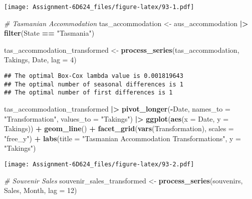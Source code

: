 \documentclass[
]{article}
\newenvironment{Shaded}{\begin{snugshade}}{\end{snugshade}}
\newcommand{\AttributeTok}[1]{\textcolor[rgb]{0.13,0.29,0.53}{#1}}
\newcommand{\CommentTok}[1]{\textcolor[rgb]{0.56,0.35,0.01}{\textit{#1}}}
\newcommand{\DecValTok}[1]{\textcolor[rgb]{0.00,0.00,0.81}{#1}}
\newcommand{\FunctionTok}[1]{\textcolor[rgb]{0.13,0.29,0.53}{\textbf{#1}}}
\newcommand{\NormalTok}[1]{#1}
\newcommand{\OtherTok}[1]{\textcolor[rgb]{0.56,0.35,0.01}{#1}}
\newcommand{\SpecialCharTok}[1]{\textcolor[rgb]{0.81,0.36,0.00}{\textbf{#1}}}
\newcommand{\StringTok}[1]{\textcolor[rgb]{0.31,0.60,0.02}{#1}}
\begin{document}
\texttt{[image: Assignment-6D624\_files/figure-latex/93-1.pdf]}

\begin{Shaded}
\begin{Highlighting}[]
\CommentTok{\# Tasmanian Accommodation}
\NormalTok{tas\_accommodation }\OtherTok{\textless{}{-}}\NormalTok{ aus\_accommodation }\SpecialCharTok{|\textgreater{}} 
  \FunctionTok{filter}\NormalTok{(State }\SpecialCharTok{==} \StringTok{"Tasmania"}\NormalTok{)}

\NormalTok{tas\_accommodation\_transformed }\OtherTok{\textless{}{-}} \FunctionTok{process\_series}\NormalTok{(tas\_accommodation, Takings, Date, }\AttributeTok{lag =} \DecValTok{4}\NormalTok{)}
\end{Highlighting}
\end{Shaded}

\begin{verbatim}
## The optimal Box-Cox lambda value is 0.001819643 
## The optimal number of seasonal differences is 1 
## The optimal number of first differences is 1
\end{verbatim}

\begin{Shaded}
\begin{Highlighting}[]
\NormalTok{tas\_accommodation\_transformed }\SpecialCharTok{|\textgreater{}} 
  \FunctionTok{pivot\_longer}\NormalTok{(}\SpecialCharTok{{-}}\NormalTok{Date, }\AttributeTok{names\_to =} \StringTok{"Transformation"}\NormalTok{, }\AttributeTok{values\_to =} \StringTok{"Takings"}\NormalTok{) }\SpecialCharTok{|\textgreater{}} 
  \FunctionTok{ggplot}\NormalTok{(}\FunctionTok{aes}\NormalTok{(}\AttributeTok{x =}\NormalTok{ Date, }\AttributeTok{y =}\NormalTok{ Takings)) }\SpecialCharTok{+}
  \FunctionTok{geom\_line}\NormalTok{() }\SpecialCharTok{+}
  \FunctionTok{facet\_grid}\NormalTok{(}\FunctionTok{vars}\NormalTok{(Transformation), }\AttributeTok{scales =} \StringTok{"free\_y"}\NormalTok{) }\SpecialCharTok{+}
  \FunctionTok{labs}\NormalTok{(}\AttributeTok{title =} \StringTok{"Tasmanian Accommodation Transformations"}\NormalTok{, }\AttributeTok{y =} \StringTok{"Takings"}\NormalTok{)}
\end{Highlighting}
\end{Shaded}

\texttt{[image: Assignment-6D624\_files/figure-latex/93-2.pdf]}

\begin{Shaded}
\begin{Highlighting}[]
\CommentTok{\# Souvenir Sales}
\NormalTok{souvenir\_sales\_transformed }\OtherTok{\textless{}{-}} \FunctionTok{process\_series}\NormalTok{(souvenirs, Sales, Month, }\AttributeTok{lag =} \DecValTok{12}\NormalTok{)}
\end{Highlighting}
\end{Shaded}
\end{document}
